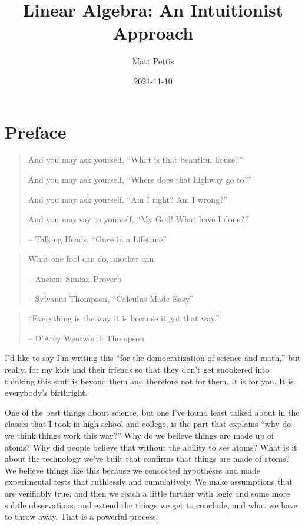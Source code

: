\documentclass[
]{book}
\title{Linear Algebra: An Intuitionist Approach}
\author{Matt Pettis}
\date{2021-11-10}
\begin{document}
\maketitle

{
\setcounter{tocdepth}{1}
\tableofcontents
}
\hypertarget{preface}{%
\chapter{Preface}\label{preface}}

\begin{quote}
And you may ask yourself, ``What is that beautiful house?''

And you may ask yourself, ``Where does that highway go to?''

And you may ask yourself, ``Am I right? Am I wrong?''

And you may say to yourself, ``My God! What have I done?''

-- Talking Heads, ``Once in a Lifetime''
\end{quote}

\begin{quote}
What one fool can do, another can.

-- Ancient Simian Proverb

-- Sylvanus Thompson, ``Calculus Made Easy''
\end{quote}

\begin{quote}
``Everything is the way it is because it got that way.''

-- D'Arcy Wentworth Thompson
\end{quote}

I'd like to say I'm writing this ``for the democratization of science and math,'' but really, for my kids and their friends so that they don't get snookered into thinking this stuff is beyond them and therefore not for them. It is for you. It is everybody's birthright.

One of the best things about science, but one I've found least talked about in the classes that I took in high school and college, is the part that explains ``why do we think things work this way?'' Why do we believe things are made up of atoms? Why did people believe that without the ability to \emph{see} atoms? What is it about the technology we've built that confirms that things are made of atoms? We believe things like this because we concocted hypotheses and made experimental tests that ruthlessly and cumulatively. We make assumptions that are verifiably true, and then we reach a little further with logic and some more subtle observations, and extend the things we get to conclude, and what we have to throw away. That is a powerful process.
\end{document}
